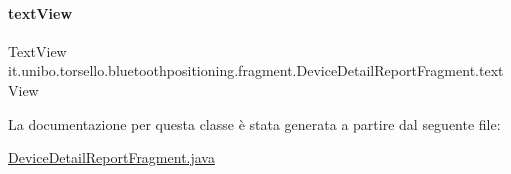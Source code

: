 \paragraph{\texorpdfstring{text\+View}{textView}}
{\footnotesize\ttfamily Text\+View it.\+unibo.\+torsello.\+bluetoothpositioning.\+fragment.\+Device\+Detail\+Report\+Fragment.\+text\+View\hspace{0.3cm}{\ttfamily [private]}}



La documentazione per questa classe è stata generata a partire dal seguente file\+:\begin{DoxyCompactItemize}
\item 
\hyperlink{DeviceDetailReportFragment_8java}{Device\+Detail\+Report\+Fragment.\+java}\end{DoxyCompactItemize}
